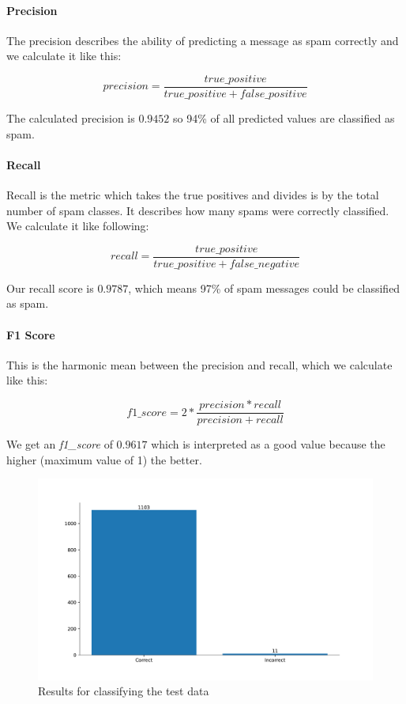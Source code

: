\paragraph{Precision}
The precision describes the ability of predicting a message as spam correctly and we calculate it like this:

$$precision = \frac{true\_positive}{true\_positive + false\_positive}$$

The calculated precision is $0.9452$ so 94\% of all predicted values are classified as spam. 

\paragraph{Recall}
Recall is the metric which takes the true positives and divides is by the total number of spam classes. It describes how many spams were correctly classified. We calculate it like following:

$$recall = \frac{true\_positive}{true\_positive + false\_negative}$$

Our recall score is $0.9787$, which means 97\% of spam messages could be classified as spam.

\paragraph{F1 Score}
This is the harmonic mean between the precision and recall, which we calculate like this:

$$f1\_score = 2 *  \frac{precision * recall}{precision + recall}$$

We get an \textit{f1\_score} of $0.9617$ which is interpreted as a good value because the higher (maximum value of 1) the better.

\begin{figure}[htbp]
  \centering
  \includegraphics[width=\textwidth]{images/bar_plot.pdf}
  \caption{Results for classifying the test data}
  \label{test-data-result}
\end{figure}

